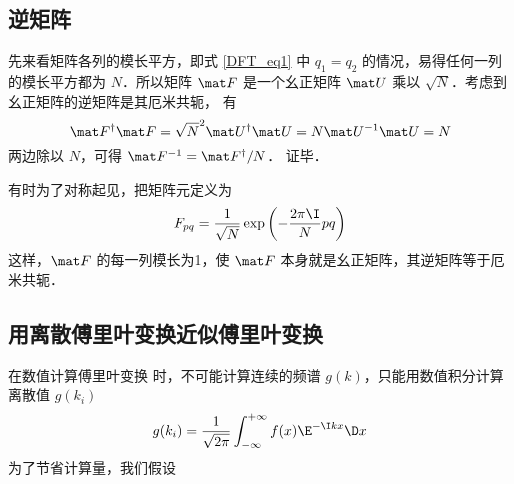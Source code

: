\subsection{逆矩阵}
先来看矩阵各列的模长平方，即式 \eqref{DFT_eq1} 中 $q_1=q_2$ 的情况，易得任何一列的模长平方都为 $N$．所以矩阵 $\mat F$ 是一个幺正矩阵 $\mat U$ 乘以 $\sqrt{N}$．考虑到幺正矩阵的逆矩阵是其厄米共轭， %
有
\begin{equation}
\mat F^\dag \mat F = \sqrt{N}^2 \mat U^\dag \mat U = N \mat U^{-1} \mat U = N
\end{equation}
两边除以 $N$，可得 $\mat F^{-1} = \mat F^\dag /N$． 证毕．

有时为了对称起见，把矩阵元定义为
\begin{equation}
F_{pq} = \frac{1}{\sqrt{N}}\exp\left(-\frac{2\pi\I}{N} p q \right)
\end{equation}
这样，$\mat F$ 的每一列模长为1，使 $\mat F$ 本身就是幺正矩阵，其逆矩阵等于厄米共轭．

\subsection{用离散傅里叶变换近似傅里叶变换}
在数值计算傅里叶变换 %
时，不可能计算连续的频谱 $g(k)$，只能用数值积分计算离散值 $g(k_i)$
\begin{equation}
g(k_i) = \frac{1}{\sqrt{2\pi}} \int_{-\infty}^{+\infty} f(x)\E^{-\I kx} \D x
\end{equation}
为了节省计算量，我们假设

